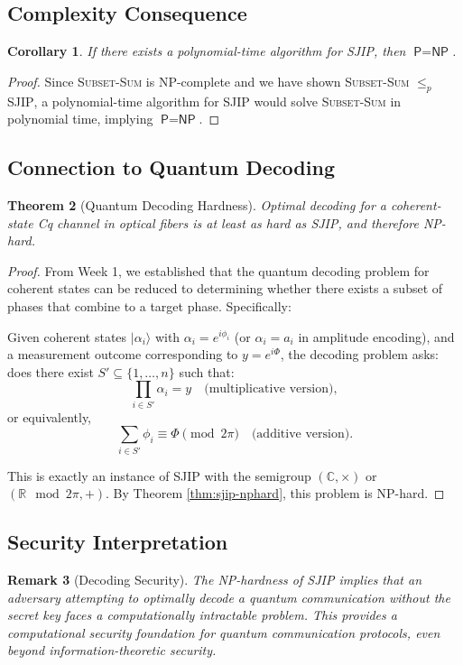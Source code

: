 \documentclass[11pt]{article}
\newtheorem{theorem}{Theorem}[section]
\newtheorem{corollary}[theorem]{Corollary}
\newtheorem{remark}[theorem]{Remark}
\begin{document}
\subsection{Complexity Consequence}
\begin{corollary}
If there exists a polynomial-time algorithm for \textsc{SJIP}, then $\textsf{P} = \textsf{NP}$.
\end{corollary}
\begin{proof}
Since \textsc{Subset-Sum} is NP-complete and we have shown \textsc{Subset-Sum} $\leq_p$ \textsc{SJIP}, a polynomial-time algorithm for \textsc{SJIP} would solve \textsc{Subset-Sum} in polynomial time, implying $\textsf{P} = \textsf{NP}$.
\end{proof}

\subsection{Connection to Quantum Decoding}
\begin{theorem}[Quantum Decoding Hardness]
\label{thm:quantum-hardness}
Optimal decoding for a coherent-state Cq channel in optical fibers is at least as hard as \textsc{SJIP}, and therefore NP-hard.
\end{theorem}

\begin{proof}
From Week 1, we established that the quantum decoding problem for coherent states can be reduced to determining whether there exists a subset of phases that combine to a target phase. Specifically:

Given coherent states $|\alpha_i\rangle$ with $\alpha_i = e^{i\phi_i}$ (or $\alpha_i = a_i$ in amplitude encoding), and a measurement outcome corresponding to $y = e^{i\Phi}$, the decoding problem asks: does there exist $S' \subseteq \{1, \dots, n\}$ such that:
\[
\prod_{i \in S'} \alpha_i = y \quad \text{(multiplicative version)},
\]
or equivalently,
\[
\sum_{i \in S'} \phi_i \equiv \Phi \pmod{2\pi} \quad \text{(additive version)}.
\]

This is exactly an instance of \textsc{SJIP} with the semigroup $(\mathbb{C}, \times)$ or $(\mathbb{R} \mod 2\pi, +)$. By Theorem \ref{thm:sjip-nphard}, this problem is NP-hard.
\end{proof}

\subsection{Security Interpretation}
\begin{remark}[Decoding Security]
The NP-hardness of \textsc{SJIP} implies that an adversary attempting to optimally decode a quantum communication without the secret key faces a computationally intractable problem. This provides a computational security foundation for quantum communication protocols, even beyond information-theoretic security.
\end{remark}
\end{document}
